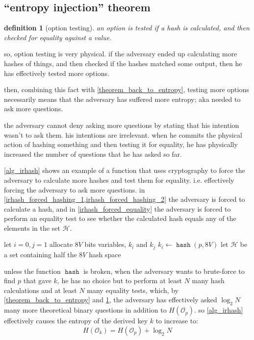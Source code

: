 \documentclass[twocolumn]{article}
\newtheorem{definition}{definition}[section]
\DeclareMathOperator{\hash}{\mathtt{hash}}
\DeclareMathOperator{\irhash}{\mathtt{irhash}}
\begin{document}
\subsection{``entropy injection'' theorem}
\begin{definition}[option testing]\label{def_option_testing}
    an option is tested if a hash is calculated, and then checked for
    equality against a value.
\end{definition}

so, option testing is very physical.  if the adversary ended up calculating
more hashes of things, and then checked if the hashes matched some output,
then he has effectively tested more options.

then, combining this fact with \cref{theorem_back_to_entropy}, testing more
options necessarily means that the adversary has suffered more entropy; aka
needed to ask more questions.

the adversary cannot deny asking more questions by stating that his
intention wasn't to ask them.  his intentions are irrelevant.  when he
commits the physical action of hashing something and then testing it for
equality, he has physically increased the number of questions that he has
asked so far.

\cref{alg_irhash} shows an example of a function that uses cryptography to
force the adversary to calculate more hashes and test them for equality.
i.e.  effectively forcing the adversary to ask more questions.  in
\cref{irhash_forced_hashing_1,irhash_forced_hashing_2} the adversary is
forced to calculate a hash, and in \cref{irhash_forced_equality} the
adversary is forced to perform an equality test to see whether the
calculated hash equals any of the elements in the set $\mathcal{H}$.

\begin{algorithm}
let $i=0, j=1$\;
allocate $8V$ bits variables, $k_i$ and $k_j$\;
$k_i \gets \hash(p, 8V)$\;\label{irhash_forced_hashing_1}
let $\mathcal{H}$ be a set containing half the $8V$ hash space\;
\For{$0, 1, \ldots, N-1$}{
    \If{$k_i \in \mathcal{H}$}{\label{irhash_forced_equality}
        $k_i \gets k_i + 1$\;
    }
    $k_j \gets \hash(k_i, 8V)$\;\label{irhash_forced_hashing_2}
    $\hat i \gets i$\;
    $i \gets j$\;
    $j \gets \hat i$\;
}
\caption{$\irhash(p, 8V, N)$}
\label{alg_irhash}
\end{algorithm}

unless the function $\hash$ is broken, when the adversary wants to
brute-force to find $p$ that gave $k$, he has no choice but to perform at
least $N$ many hash calculations and at least $N$ many equality tests,
which, by \cref{theorem_back_to_entropy} and \cref{def_option_testing}, the
adversary has effectively asked $\log_2 N$ many more theoretical binary
questions in addition to $H(\mathcal{O}_p)$.  so \cref{alg_irhash}
effectively causes the entropy of the derived key $k$ to increase to:
\begin{equation}
    H(\mathcal{O}_k) = H(\mathcal{O}_p) + \log_2 N
\end{equation}
\end{document}
